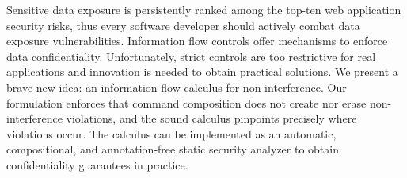 Sensitive data exposure is persistently ranked among the top-ten web application security risks, thus every software developer should actively combat data exposure vulnerabilities.
Information flow controls offer mechanisms to enforce data confidentiality.
Unfortunately, strict controls are too restrictive for real applications and innovation is needed to obtain practical solutions.
We present a brave new idea: an information flow calculus for non-interference.
Our formulation enforces that command composition does not create nor erase non-interference violations, and the sound calculus pinpoints precisely where violations occur.
The calculus can be implemented as an automatic, compositional, and annotation-free static security analyzer to obtain confidentiality guarantees in practice.